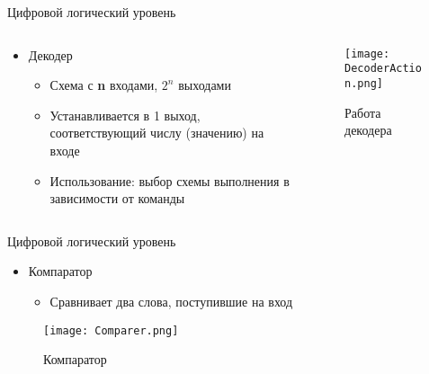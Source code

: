 \documentclass[aspectratio=169,14pt]{beamer}
\begin{document}
\begin{frame}{Цифровой логический уровень}
    \begin{columns}[T,onlytextwidth]
        \begin{column}{0.6\textwidth}
            \begin{itemize}
            \item Декодер
                \begin{itemize}
                    \item Схема с \textbf{n} входами, $2^n$ выходами
                    \item Устанавливается в 1 выход, соответствующий числу (значению) на входе
                    \item Использование: выбор схемы выполнения в зависимости от команды
                \end{itemize}
            \end{itemize}
        \end{column}
        \begin{column}{0.4\textwidth}
            \begin{figure}[htp]
                \centering
                \texttt{[image: DecoderAction.png]}
                \caption{\tiny{Работа декодера}}
            \end{figure}
        \end{column}
    \end{columns}
\end{frame}

\begin{frame}{Цифровой логический уровень}
    \begin{itemize}
        \item Компаратор
        \begin{itemize}
            \item Сравнивает два слова, поступившие на вход
        \end{itemize}
    \end{itemize}
    \begin{figure}[htp]
        \centering
        \texttt{[image: Comparer.png]}
        \caption{\tiny{Компаратор}}
    \end{figure}
\end{frame}
\end{document}
